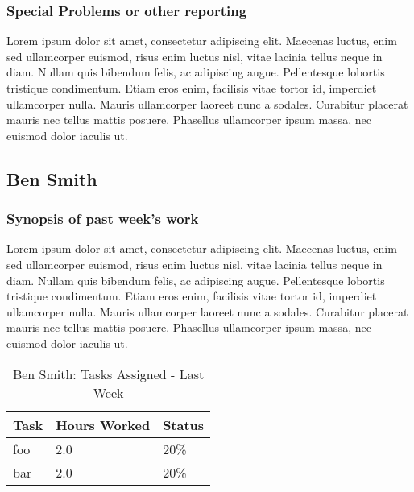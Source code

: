 \documentclass[12pt,article,compsoc]{IEEEtran}
\begin{document}
	\subsubsection*{Special Problems or other reporting}
	Lorem ipsum dolor sit amet, consectetur adipiscing elit. Maecenas luctus, enim sed ullamcorper euismod, risus enim luctus nisl, vitae lacinia tellus neque in diam. Nullam quis bibendum felis, ac adipiscing augue. Pellentesque lobortis tristique condimentum. Etiam eros enim, facilisis vitae tortor id, imperdiet ullamcorper nulla. Mauris ullamcorper laoreet nunc a sodales. Curabitur placerat mauris nec tellus mattis posuere. Phasellus ullamcorper ipsum massa, nec euismod dolor iaculis ut.

\subsection{Ben Smith}

	\subsubsection*{Synopsis of past week's work}

	Lorem ipsum dolor sit amet, consectetur adipiscing elit. Maecenas luctus, enim sed ullamcorper euismod, risus enim luctus nisl, vitae lacinia tellus neque in diam. Nullam quis bibendum felis, ac adipiscing augue. Pellentesque lobortis tristique condimentum. Etiam eros enim, facilisis vitae tortor id, imperdiet ullamcorper nulla. Mauris ullamcorper laoreet nunc a sodales. Curabitur placerat mauris nec tellus mattis posuere. Phasellus ullamcorper ipsum massa, nec euismod dolor iaculis ut.


	\begin{table}[ht]
	\renewcommand{\arraystretch}{1.3}
		\caption{Ben Smith: Tasks Assigned - Last Week}
		
		\label{Summary of Ben Smith's activities: last week}
		
		\centering
		\begin{tabular}{p{5.5cm}|p{1cm}|p{1cm}}

		\hline
		\bfseries 		Task					& \bfseries Hours Worked		& \bfseries Status	\\
		\hline\hline
					foo					& 2.0						& 20\%				\\	%
					bar					& 2.0						& 20\%				\\	
		\hline
		\end{tabular}
	\end{table}
\end{document}
